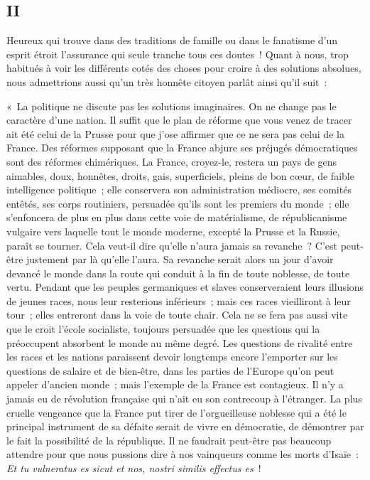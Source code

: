 \documentclass[french,twoside]{book} %
\newenvironment{quoteblock}%
  {\begin{quoting}}
  {\end{quoting}}
\newenvironment{quotebar}{%
    \def\FrameCommand{{\color{rubric!10!}\vrule width 0.5em} \hspace{0.9em}}%
    \def\OuterFrameSep{\itemsep} %
    \MakeFramed {\advance\hsize-\width \FrameRestore}
  }%
  {%
    \endMakeFramed
  }
\renewenvironment{quoteblock}%
  {%
    \savenotes
    \setstretch{0.9}
    \normalfont
    \begin{quotebar}
  }
  {%
    \end{quotebar}
    \spewnotes
  }
\begin{document}
\subsection[{II}]{II}
\noindent Heureux qui trouve dans des traditions de famille ou dans le fanatisme d’un esprit étroit l’assurance qui seule tranche tous ces doutes ! Quant à nous, trop habitués à voir les différents cotés des choses pour croire à des solutions absolues, nous admettrions aussi qu’un très honnête citoyen parlât ainsi qu’il suit :\par

\begin{quoteblock}
 \noindent « La politique ne discute pas les solutions imaginaires. On ne change pas le caractère d’une nation. Il suffit que le plan de réforme que vous venez de tracer ait été celui de la Prusse pour que j’ose affirmer que ce ne sera pas celui de la France. Des réformes supposant que la France abjure ses préjugés démocratiques sont des réformes chimériques. La France, croyez-le, restera un pays de gens aimables, doux, honnêtes, droits, gais, superficiels, pleins de bon cœur, de faible intelligence politique ; elle conservera son administration médiocre, ses comités entêtés, ses corps routiniers, persuadée qu’ils sont les premiers du monde ; elle s’enfoncera de plus en plus dans cette voie de matérialisme, de républicanisme vulgaire vers laquelle tout le monde moderne, excepté la Prusse et la Russie, paraît se tourner. Cela veut-il dire qu’elle n’aura jamais sa revanche ? C’est peut-être justement par là qu’elle l’aura. Sa revanche serait alors un jour d’avoir devancé le monde dans la route qui conduit à la fin de toute noblesse, de toute vertu. Pendant que les peuples germaniques et slaves conserveraient leurs illusions de jeunes races, nous leur resterions inférieurs ; mais ces races vieilliront à leur tour ; elles entreront dans la voie de toute chair. Cela ne se fera pas aussi vite que le croit l’école socialiste, toujours persuadée que les questions qui la préoccupent absorbent le monde au même degré. Les questions de rivalité entre les races et les nations paraissent devoir longtemps encore l’emporter sur les questions de salaire et de bien-être, dans les parties de l’Europe qu’on peut appeler d’ancien monde ; mais l’exemple de la France est contagieux. Il n’y a jamais eu de révolution française qui n’ait eu son contrecoup à l’étranger. La plus cruelle vengeance que la France put tirer de l’orgueilleuse noblesse qui a été le principal instrument de sa défaite serait de vivre en démocratie, de démontrer par le fait la possibilité de la république. Il ne faudrait peut-être pas beaucoup attendre pour que nous pussions dire à nos vainqueurs comme les morts d’Isaïe : {\itshape Et tu vulneratus es sicut et nos, nostri similis effectus es} ! \par

\end{quoteblock}
\end{document}
